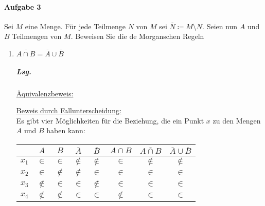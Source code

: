 \documentclass{scrreprt}
\begin{document}
\newpage
\paragraph{Aufgabe 3} Sei $M$ eine Menge.
Für jede Teilmenge $N$ von $M$ sei $\overline{N} \coloneqq M \setminus N$.
Seien nun $A$ und $B$ Teilmengen von $M$.
Beweisen Sie die de Morganschen Regeln
\begin{enumerate}[(1)]
\item $\overline{A \cap B} = \overline{A} \cup \overline{B}$

  \subparagraph{Lsg.} \underline{Äquivalenzbeweis:}

  \underline{Beweis durch Fallunterscheidung:} \\
  Es gibt vier Möglichkeiten für die Beziehung, die ein Punkt $x$ zu den
  Mengen $A$ und $B$ haben kann:
  \begin{center}

    \begin{tabular}{c | c | c | c | c | c | c | c}
      & $A$ & $B$ & $\overline{A}$ & $\overline{B}$ & $A \cap B$ & $\overline{A \cap B}$ & $\overline{A} \cup \overline{B}$ \\
      \hline
      $x_1$ & $\in$ & $\in$ & $\notin$ & $\notin$ & $\in$ & $\notin$ & $\notin$ \\
      $x_2$ & $\in$ & $\notin$ & $\notin$ & $\in$ & $\in$ & $\in$ & $\in$ \\
      $x_3$ & $\notin$ & $\in$ & $\in$  & $\notin$ & $\in$ & $\in$ & $\in$ \\
      $x_4$ & $\notin$ & $\notin$ & $\in$ & $\in$ & $\notin$ & $\in$ & $\in$
    \end{tabular}
  \end{center}


\end{enumerate}
\end{document}
